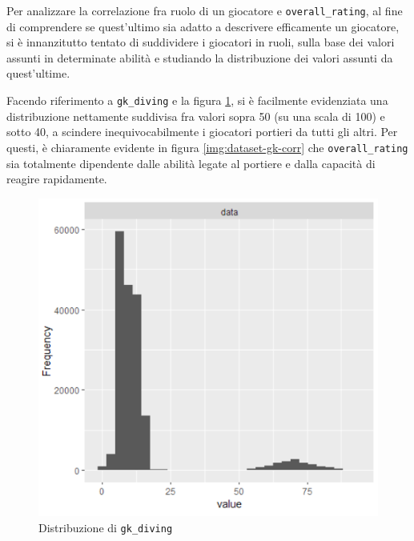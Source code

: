\documentclass[hidelinks, 12pt]{article}
\begin{document}
Per analizzare la correlazione fra ruolo di un giocatore e \texttt{overall\_rating}, al fine di comprendere se quest'ultimo sia adatto a descrivere efficamente un giocatore, si è innanzitutto tentato di suddividere i giocatori in ruoli, sulla base dei valori assunti in determinate abilità e studiando la distribuzione dei valori assunti da quest'ultime.

Facendo riferimento a \texttt{gk\_diving} e la figura \ref{img:dataset-gkdiving-distr}, si è facilmente evidenziata una distribuzione nettamente suddivisa fra valori sopra 50 (su una scala di 100) e sotto 40, a scindere inequivocabilmente i giocatori portieri da tutti gli altri. Per questi, è chiaramente evidente in figura \ref{img:dataset-gk-corr} che \texttt{overall\_rating} sia totalmente dipendente dalle abilità legate al portiere e dalla capacità di reagire rapidamente.

\begin{figure}[H]
	\centering
	\includegraphics[scale=0.65]{images/04_02_gkdiving_distribution.png}
	\caption[Distribuzione di \texttt{gk\_diving}]{Distribuzione di \texttt{gk\_diving}}
	\label{img:dataset-gkdiving-distr}
\end{figure}
\end{document}
